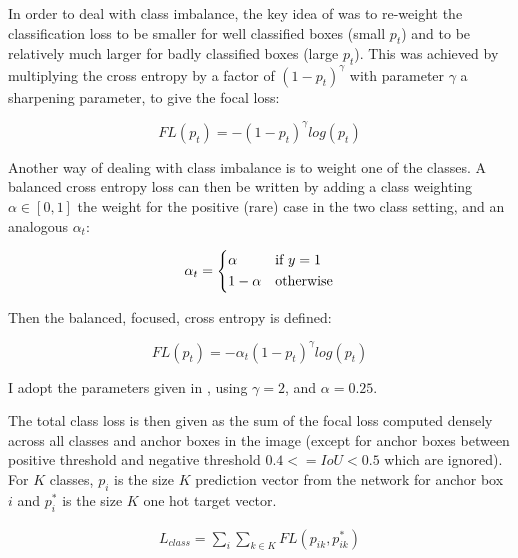 In order to deal with class imbalance, the key idea of \cite{Lin2017} was to re-weight the classification loss to be smaller for well classified boxes (small $p_t$) and to be relatively much larger for badly classified boxes (large $p_t$). This was achieved by multiplying the cross entropy by a factor of $(1 - p_t)^\gamma $ with parameter $\gamma$ a sharpening parameter, to give the focal loss:

\begin{equation}
FL(p_t) = - (1 - p_t)^\gamma log(p_t)
\label{eq:focal_loss_p}
\end{equation}

Another way of dealing with class imbalance is to weight one of the classes. A balanced cross entropy loss can then be written by adding a class weighting $\alpha \in \left[0, 1\right]$ the weight for the positive (rare) case in the two class setting, and an analogous $\alpha_t$:

\begin{equation}
\alpha_t = 
  \begin{cases*}
  \alpha & if $y = 1$\\
  1 - \alpha & otherwise\\
  \end{cases*}
\label{eq:balanced_weight}
\end{equation}

Then the balanced, focused, cross entropy is defined:

\begin{equation}
FL(p_t) = -\alpha_t (1 - p_t)^\gamma log(p_t)
\label{eq:focal_loss}
\end{equation}

I adopt the parameters given in \cite{Lin2017}, using $ \gamma = 2 $, and $ \alpha = 0.25 $. 

The total class loss is then given as the sum of the focal loss computed densely across all classes and anchor boxes in the image (except for anchor boxes between positive threshold and negative threshold $0.4 <= IoU < 0.5$ which are ignored). For $K$ classes, $p_i$ is the size $K$ prediction vector from the network for anchor box $i$ and $p^*_i$ is the size $K$ one hot target vector.

\begin{equation}
\begin{split}
L_{class} = \sum_i{\sum_{k \in K}FL(p_{ik}, p^*_{ik})}
\end{split}
\label{eq:class_loss}
\end{equation}

